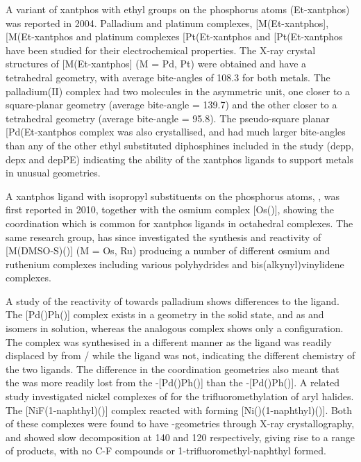 A variant of xantphos with ethyl groups on the phosphorus atoms (Et-xantphos) was reported in 2004.\cite{Miedaner2004, Raebiger2004}  Palladium and platinum complexes, [M(Et-xantphos], [M(Et-xantphos\ce{)2]^{2+}} and platinum complexes [Pt(Et-xantphos\ce{)2H]PF6} and [Pt(Et-xantphos\ce{)2(H)2]^{2+}} have been studied for their electrochemical properties.  The X-ray crystal structures of [M(Et-xantphos] (M = Pd, Pt) were obtained and have a tetrahedral geometry, with average bite-angles of 108.3\degrees{} for both metals.  The palladium(II) complex had two molecules in the asymmetric unit, one closer to a square-planar geometry (average bite-angle = 139.7\degrees) and the other closer to a tetrahedral geometry (average bite-angle = 95.8\degrees).  The pseudo-square planar [Pd(Et-xantphos\ce{)2](BF4)2} complex was also crystallised, and had much larger bite-angles than any of the other ethyl substituted diphosphines included in the study (\gls{depp}, \gls{depx} and \gls{depPE}) indicating the ability of the xantphos ligands to support metals in unusual geometries.  

A xantphos ligand with isopropyl substituents on the phosphorus atoms, \iPrxantphos{}, was first reported in 2010, together with the osmium complex [Os(\iPrxantphosk)], showing the \POP{} coordination which is common for xantphos ligands in octahedral complexes.\cite{Asensio2010}  The same research group, has since investigated the synthesis and reactivity of [M(DMSO-\dento{}S)(\fixme{\iPrxantphos})] (M = Os, Ru) producing a number of different osmium and ruthenium complexes including various polyhydrides and bis(alkynyl)vinylidene complexes.\cite{Alos2013, Alos2014}  

A study of the reactivity of \iPrxantphos{} towards palladium shows differences to the \Phxantphos{} ligand.\cite{Bakhmutov2012}  The [Pd()Ph(\Phxantphos)] complex exists in a \cis{} geometry in the solid state, and as \cis{} and \trans{} isomers in solution, whereas the analogous \iPrxantphos{} complex shows only a \trans{} configuration.  The \iPrxantphos{} complex was synthesised in a different manner as the \Phxantphos{} ligand was readily displaced by  from / while the \iPrxantphos{} ligand was not, indicating the different chemistry of the two ligands.  The difference in the coordination geometries also meant that the  was more readily lost from the \cis-[Pd()Ph(\Phxantphos)] than the \trans-[Pd()Ph(\iPrxantphos)].  A related study investigated nickel complexes of \iPrxantphos{} for the trifluoromethylation of aryl halides.\cite{Jover2014}  The [NiF(1-naphthyl)(\iPrxantphos)] complex reacted with  forming [Ni()(1-naphthyl)(\iPrxantphos)].  Both of these complexes were found to have \trans{}-geometries through X-ray crystallography, and showed slow decomposition at 140 \degC{} and 120 \degC{} respectively, giving rise to a range of products, with no C-F compounds or 1-trifluoromethyl-naphthyl formed.  

